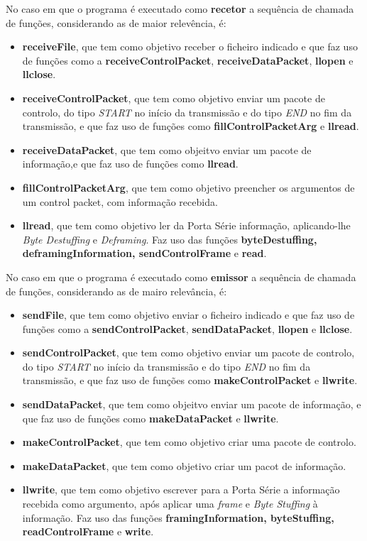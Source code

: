 \documentclass[a4paper, 11pt]{article}
\begin{document}
No caso em que o programa é executado como \textbf{recetor} a sequência de chamada de funções, considerando as de maior relevência, é:
\begin{itemize}
	\item \textbf{receiveFile}, que tem como objetivo receber o ficheiro indicado e que faz uso de funções como a \textbf{receiveControlPacket}, \textbf{receiveDataPacket}, \textbf{llopen} e \textbf{llclose}.
	\item \textbf{receiveControlPacket}, que tem como objetivo enviar um pacote de controlo, do tipo \textit{START} no início da transmissão e do tipo \textit{END} no fim da transmissão, e que faz uso de funções como \textbf{fillControlPacketArg} e \textbf{llread}.
	\item \textbf{receiveDataPacket},  que tem como objeitvo enviar um pacote de informação,e que faz uso de funções como \textbf{llread}.
	\item \textbf{fillControlPacketArg}, que tem como objetivo preencher os argumentos de um control packet, com informação recebida.
	\item \textbf{llread}, que tem como objetivo ler da Porta Série informação, aplicando-lhe \textit{Byte Destuffing} e \textit{Deframing}. Faz uso das funções \textbf{byteDestuffing, deframingInformation, sendControlFrame} e \textbf{read}.
\end{itemize}

No caso em que o programa é executado como \textbf{emissor} a sequência de chamada de funções, considerando as de mairo relevância, é:
\begin{itemize}
	\item \textbf{sendFile}, que tem como objetivo enviar o ficheiro indicado e que faz uso de funções como a \textbf{sendControlPacket}, \textbf{sendDataPacket}, \textbf{llopen} e \textbf{llclose}.
	\item \textbf{sendControlPacket}, que tem como objetivo enviar um pacote de controlo, do tipo \textit{START} no início da transmissão e do tipo \textit{END} no fim da transmissão, e que faz uso de funções como \textbf{makeControlPacket} e \textbf{llwrite}.
	\item \textbf{sendDataPacket},  que tem como objeitvo enviar um pacote de informação, e que faz uso de funções como \textbf{makeDataPacket} e \textbf{llwrite}.
	\item \textbf{makeControlPacket}, que tem como objetivo criar uma pacote de controlo.
	\item \textbf{makeDataPacket}, que tem como objetivo criar um pacot de informação.
	\item \textbf{llwrite}, que tem como objetivo escrever para a Porta Série a informação recebida como argumento, após aplicar uma \textit{frame} e \textit{Byte Stuffing} à informação. Faz uso das funções \textbf{framingInformation, byteStuffing, readControlFrame} e \textbf{write}.
\end{itemize}
\end{document}
